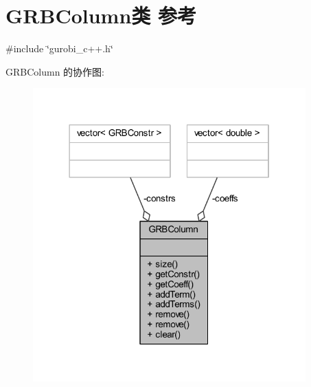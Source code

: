 \hypertarget{classGRBColumn}{}\section{G\+R\+B\+Column类 参考}
\label{classGRBColumn}


{\ttfamily \#include \char`\"{}gurobi\+\_\+c++.\+h\char`\"{}}



G\+R\+B\+Column 的协作图\+:
\nopagebreak
\begin{figure}[H]
\begin{center}
\leavevmode
\includegraphics[width=298pt]{classGRBColumn__coll__graph}
\end{center}
\end{figure}
